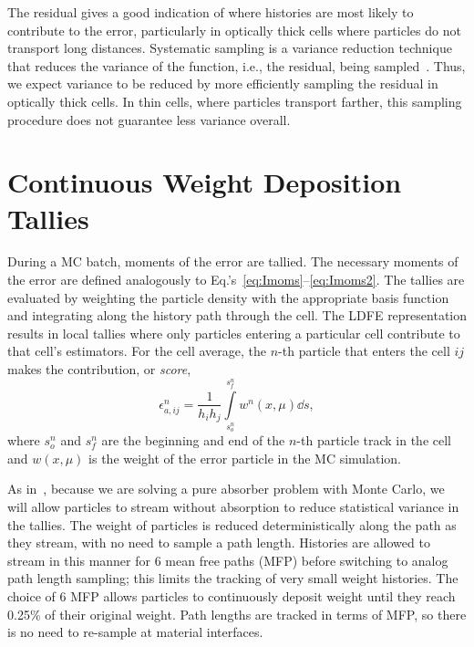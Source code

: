 The residual gives a good indication of where
histories are most likely to contribute to the error, particularly in optically
thick cells where particles do not transport long distances. Systematic sampling is a
variance reduction technique that reduces the variance of the function, i.e., the residual, being sampled~\cite{shultis_mc}.  Thus, we expect
variance to be reduced by more efficiently sampling the residual in optically thick cells.  In thin
cells, where particles transport farther, this sampling procedure does not guarantee less variance
overall. 


\section{Continuous Weight Deposition Tallies}
\label{sec:tallies}

During a MC batch, moments of the error are tallied.  The necessary moments of the error are
defined analogously to Eq.'s~\eqref{eq:Imoms}--\eqref{eq:Imoms2}.  
The tallies are evaluated by weighting the particle density with the appropriate
basis function and integrating along the history path through the cell.  The LDFE
representation results in local tallies where only particles entering a particular cell
contribute to that cell's estimators.  For the cell average, the $n$-th
particle that enters the cell $ij$ makes the contribution, or \emph{score},
\begin{equation}\label{eq:avg_tal}
   \epsilon^n_{a,ij} = \frac{1}{h_ih_j} \int\limits_{s^n_o}^{s^n_f}  w^n(x,\mu) \dd s,
\end{equation}
where $s_o^n$ and $s_f^n$ are the beginning and end of the $n$-th particle track in the cell and $w(x,\mu)$ is
the weight of the error particle in the MC simulation. 

As in~\cite{park}, because we are solving a pure absorber problem with Monte Carlo, we will allow
particles to stream without absorption to reduce statistical 
variance in the tallies.  The weight of particles is reduced deterministically along
the path as they stream, with no need to sample a path length. Histories are allowed to stream in this manner for 6 mean free paths (MFP)
before switching to analog path length sampling; this limits the tracking of very small weight histories. The choice of 6 MFP allows particles to 
continuously deposit weight until they reach 0.25\% of their original weight.  Path lengths are tracked in terms of MFP, so there is no need to re-sample at material
interfaces.

